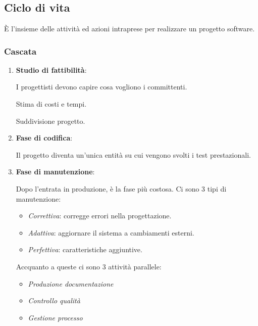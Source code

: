 \documentclass{report}
\begin{document}
\setcounter{chapter}{6}
\chapter{}
\section{Ciclo di vita}
\`E l'insieme delle attività ed azioni intraprese per realizzare un progetto software.
\subsection*{Cascata}

\begin{enumerate}
    \item \textbf{Studio di fattibilità}:

    \noindent
    I progettisti devono capire cosa vogliono i committenti.
    
    \noindent
    Stima di costi e tempi.

    \noindent
    Suddivisione progetto.

    \item \textbf{Fase di codifica}:
    
    \noindent
    Il progetto diventa un'unica entità su cui vengono svolti i test prestazionali.

    \item \textbf{Fase di manutenzione}:
    
    \noindent
    Dopo l'entrata in produzione, è la fase più costosa. Ci sono 3 tipi di manutenzione:
    \begin{itemize}
        \item \textit{Correttiva}: corregge errori nella progettazione.
        \item \textit{Adattiva}: aggiornare il sistema a cambiamenti esterni.
        \item \textit{Perfettiva}: caratteristiche aggiuntive.
    \end{itemize}

    \noindent
    Accquanto a queste ci sono 3 attività parallele:
    \begin{itemize}
        \item \textit{Produzione documentazione}
        \item \textit{Controllo qualità}
        \item \textit{Gestione processo}
    \end{itemize}
\end{enumerate}
\end{document}
